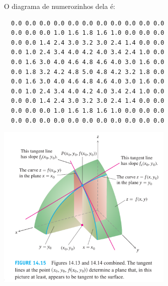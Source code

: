 \documentclass[oneside,12pt]{article}
\begin{document}
\newpage

O diagrama de numerozinhos dela é:

\begin{verbatim}
  0.0 0.0 0.0 0.0 0.0 0.0 0.0 0.0 0.0 0.0 0.0
  0.0 0.0 0.0 1.0 1.6 1.8 1.6 1.0 0.0 0.0 0.0
  0.0 0.0 1.4 2.4 3.0 3.2 3.0 2.4 1.4 0.0 0.0
  0.0 1.0 2.4 3.4 4.0 4.2 4.0 3.4 2.4 1.0 0.0
  0.0 1.6 3.0 4.0 4.6 4.8 4.6 4.0 3.0 1.6 0.0
  0.0 1.8 3.2 4.2 4.8 5.0 4.8 4.2 3.2 1.8 0.0
  0.0 1.6 3.0 4.0 4.6 4.8 4.6 4.0 3.0 1.6 0.0
  0.0 1.0 2.4 3.4 4.0 4.2 4.0 3.4 2.4 1.0 0.0
  0.0 0.0 1.4 2.4 3.0 3.2 3.0 2.4 1.4 0.0 0.0
  0.0 0.0 0.0 1.0 1.6 1.8 1.6 1.0 0.0 0.0 0.0
  0.0 0.0 0.0 0.0 0.0 0.0 0.0 0.0 0.0 0.0 0.0
\end{verbatim}



\newpage



\includegraphics[height=8cm]{2020-2-C3/2021mar18_thomas_11-1_fig_14.15.pdf}



\newpage

\end{document}

